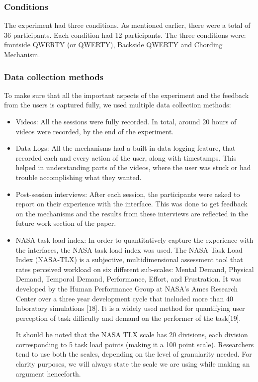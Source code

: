 \subsubsection{Conditions}

The experiment had three conditions. As mentioned earlier, there were
a total of 36 participants. Each condition had 12 participants. The
three conditions were: frontside QWERTY (or QWERTY), Backside QWERTY and Chording Mechanism.

\subsubsection{Data collection methods}

To make sure that all the important aspects of the experiment and the feedback from the users is captured fully, we used multiple data collection methods:

\begin{itemize}
\item Videos: All the sessions were fully recorded. In total, around 20 hours of videos were recorded, by the end of the experiment.
\item Data Logs: All the mechanisms had a built in data logging feature, that recorded each and every action of the user, along with timestamps. This helped in understanding parts of the videos, where the user was stuck or had trouble accomplishing what they wanted.
\item Post-session interviews: After each session, the participants were asked to report on their experience with the interface. This was done to get feedback on the mechanisms and the results from these interviews are reflected in the future work section of the paper. 

\item NASA task load index: In order to quantitatively capture the
  experience with the interfaces, the NASA task load index was
  used. The NASA Task Load Index (NASA-TLX) is a subjective,
  multidimensional assessment tool that rates perceived workload on
  six different sub-scales: Mental Demand, Physical Demand, Temporal
  Demand, Performance, Effort, and Frustration. It was developed by
  the Human Performance Group at NASA's Ames Research Center over a
  three year development cycle that included more than 40 laboratory
  simulations [18]. It is a widely used method for quantifying user
  perception of task difficulty and demand on the performer of the
  task[19].
  
  It should be noted that the NASA TLX scale has 20 divisions, each
  division corresponding to 5 task load points (making it a 100 point
  scale). Researchers tend to use both the scales, depending on the
  level of granularity needed. For clarity purposes, we will always
  state the scale we are using while making an argument henceforth.

\end{itemize}
